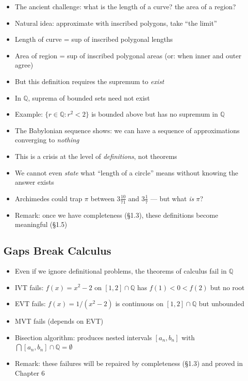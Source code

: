 \documentclass[
  10pt,
  letterpaper,
]{scrbook}
\providecommand{\tightlist}{%
  \setlength{\itemsep}{0pt}\setlength{\parskip}{0pt}}
\newcommand{\QQ}{\mathbb{Q}}
\begin{document}
\begin{itemize}
\tightlist
\item
  The ancient challenge: what is the length of a curve? the area of a
  region?
\item
  Natural idea: approximate with inscribed polygons, take ``the limit''
\item
  Length of curve = sup of inscribed polygonal lengths
\item
  Area of region = sup of inscribed polygonal areas (or: when inner and
  outer agree)
\item
  But this definition requires the supremum to \emph{exist}
\item
  In \(\QQ\), suprema of bounded sets need not exist
\item
  Example: \(\{r \in \QQ : r^2 < 2\}\) is bounded above but has no
  supremum in \(\QQ\)
\item
  The Babylonian sequence shows: we can have a sequence of
  approximations converging to \emph{nothing}
\item
  This is a crisis at the level of \emph{definitions}, not theorems
\item
  We cannot even \emph{state} what ``length of a circle'' means without
  knowing the answer exists
\item
  Archimedes could trap \(\pi\) between \(3\frac{10}{71}\) and
  \(3\frac{1}{7}\) --- but what \emph{is} \(\pi\)?
\item
  Remark: once we have completeness (§1.3), these definitions become
  meaningful (§1.5)
\end{itemize}

\subsection{Gaps Break Calculus}\label{gaps-break-calculus}

\begin{itemize}
\tightlist
\item
  Even if we ignore definitional problems, the theorems of calculus fail
  in \(\QQ\)
\item
  IVT fails: \(f(x) = x^2 - 2\) on \([1,2] \cap \QQ\) has
  \(f(1) < 0 < f(2)\) but no root
\item
  EVT fails: \(f(x) = 1/(x^2 - 2)\) is continuous on \([1,2] \cap \QQ\)
  but unbounded
\item
  MVT fails (depends on EVT)
\item
  Bisection algorithm: produces nested intervals \([a_n, b_n]\) with
  \(\bigcap [a_n, b_n] \cap \QQ = \emptyset\)
\item
  Remark: these failures will be repaired by completeness (§1.3) and
  proved in Chapter 6
\end{itemize}
\end{document}
